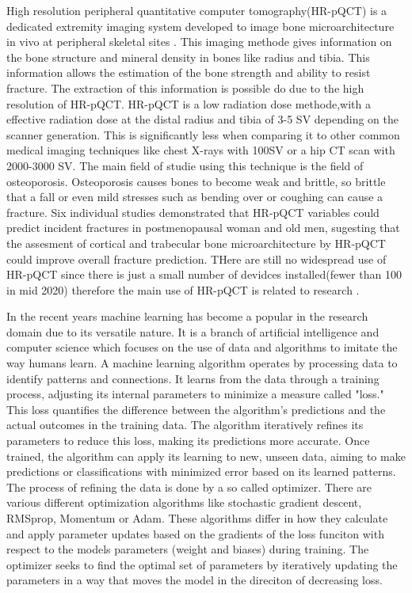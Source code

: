 \documentclass[
a4paper, 
12pt,
grayscalebody, %
abstract=on,
twoside, BCOR10mm, 12pt, DIV13,headinclude, footexclude, final, abstracton, openright
]{ibireprt}
\numberwithin{equation}{chapter}
\numberwithin{table}{chapter}
\numberwithin{figure}{chapter}
\numberwithin{algorithm}{chapter}
\numberwithin{example}{chapter}
\numberwithin{example}{chapter}
\begin{document}
High resolution peripheral quantitative computer tomography(HR-pQCT) is a  dedicated extremity imaging system developed to image bone microarchitecture in vivo at peripheral skeletal sites \cite{Bergh2021}. This imaging methode gives information on the bone structure and mineral density in bones like radius and tibia. This information allows the estimation of the bone strength and ability to resist fracture. The extraction of this information is possible do due to the high resolution of HR-pQCT. HR-pQCT is a low radiation dose methode,with a effective radiation dose at the distal radius and tibia of  3-5 \textmu SV depending on the scanner  generation. This is significantly less when comparing it to other common medical imaging techniques like chest X-rays with 100\textmu SV or a hip CT scan with 2000-3000 \textmu SV. The main field of studie using this technique is the field of osteoporosis. Osteoporosis causes bones to become weak and brittle, so brittle that a fall or even mild stresses such as bending over or coughing can cause a fracture. Six individual studies demonstrated that HR-pQCT variables could predict incident fractures in postmenopausal woman and old men, sugesting that the assesment of cortical and trabecular bone microarchitecture by HR-pQCT could improve overall fracture prediction. THere are still no widespread use of HR-pQCT since there is just a small number of devidces installed(fewer than 100 in mid 2020) therefore the main use of HR-pQCT is related to research \cite{Bergh2021}.

In the recent years machine learning has become a popular in the research domain due to its versatile nature. It is a branch of artificial intelligence and computer science which focuses on the use of data and algorithms to imitate the way humans learn. A machine learning algorithm operates by processing data to identify patterns and connections. It learns from the data through a training process, adjusting its internal parameters to minimize a measure called "loss." This loss quantifies the difference between the algorithm's predictions and the actual outcomes in the training data. The algorithm iteratively refines its parameters to reduce this loss, making its predictions more accurate. Once trained, the algorithm can apply its learning to new, unseen data, aiming to make predictions or classifications with minimized error based on its learned patterns.
The process of refining the data is done by a so called optimizer. There are various different optimization algorithms like stochastic gradient descent, RMSprop, Momentum or Adam. These algorithms differ in how they calculate and apply parameter updates based on the gradients of the loss funciton with respect to the models parameters (weight and biases) during training. The optimizer  seeks to find the optimal set of parameters by iteratively updating the parameters in a way that moves the model in the direciton of decreasing loss.
\end{document}
